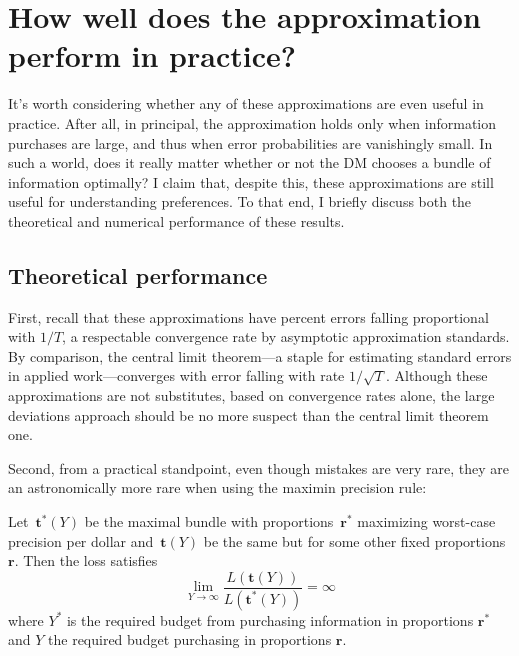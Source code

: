 \documentclass{fancyArticle}
\renewcommand{\|}{\,|\,}                    %
\providecommand{\;}{\,;}                    %
\begin{document}

\section{How well does the approximation perform in practice?}
\label{sec:numerical}

It's worth considering whether any of these approximations are even useful in practice.
After all, in principal, the approximation holds only when information purchases are large, and thus when error probabilities are vanishingly small.
In such a world, does it really matter whether or not the DM chooses a bundle of information optimally?
I claim that, despite this, these approximations are still useful for understanding preferences.
To that end, I briefly discuss both the theoretical and numerical performance of these results.

\subsection{Theoretical performance}
\label{sec:theoretical-performance}

First, recall that these approximations have percent errors falling proportional with $1/T$, a respectable convergence rate by asymptotic approximation standards.
By comparison, the central limit theorem---a staple for estimating standard errors in applied work---converges with error falling with rate $1/\sqrt{T}$.
Although these approximations are not substitutes, based on convergence rates alone, the large deviations approach should be no more suspect than the central limit theorem one.

Second, from a practical standpoint, even though mistakes are very rare, they are an astronomically more rare when using the maximin precision rule:
\begin{corollary*}
  Let\, $\mathbf{t}^{*}(Y)$ be the maximal bundle with proportions\,  $\mathbf{r}^{*}$ maximizing worst-case precision per dollar and\, $\mathbf{t}(Y)$ be the same but for some other fixed proportions\, $\mathbf{r}$.
  Then the loss satisfies
  \begin{equation*}
   \lim_{Y\rightarrow\infty} \frac{L(\mathbf{t}(Y))}{L(\mathbf{t}^{*}(Y))} = \infty
  \end{equation*}
  where $Y^{*}$ is the required budget from purchasing information in proportions $\mathbf{r}^{*}$ and $Y$ the required budget purchasing in proportions $\mathbf{r}$.
\end{corollary*}
\end{document}
